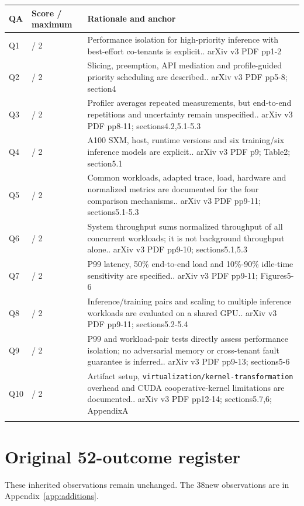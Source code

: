 \begin{longtable}{>{\raggedright\arraybackslash}p{}>{\raggedright\arraybackslash}p{}>{\raggedright\arraybackslash}p{}}
\toprule
\textbf{QA} & \textbf{Score / maximum} & \textbf{Rationale and anchor}\\\midrule\endhead
Q1 & 2 / 2 & Performance isolation for high-priority inference with best-effort co-tenants is explicit.. arXiv v3 PDF pp1-2\\\addlinespace
Q2 & 2 / 2 & Slicing, preemption, API mediation and profile-guided priority scheduling are described.. arXiv v3 PDF pp5-8; section4\\\addlinespace
Q3 & 1 / 2 & Profiler averages repeated measurements, but end-to-end repetitions and uncertainty remain unspecified.. arXiv v3 PDF pp8-11; sections4.2,5.1-5.3\\\addlinespace
Q4 & 2 / 2 & A100 SXM, host, runtime versions and six training/six inference models are explicit.. arXiv v3 PDF p9; Table2; section5.1\\\addlinespace
Q5 & 2 / 2 & Common workloads, adapted trace, load, hardware and normalized metrics are documented for the four comparison mechanisms.. arXiv v3 PDF pp9-11; sections5.1-5.3\\\addlinespace
Q6 & 2 / 2 & System throughput sums normalized throughput of all concurrent workloads; it is not background throughput alone.. arXiv v3 PDF pp9-10; sections5.1,5.3\\\addlinespace
Q7 & 2 / 2 & P99 latency, 50\% end-to-end load and 10\%-90\% idle-time sensitivity are specified.. arXiv v3 PDF pp9-11; Figures5-6\\\addlinespace
Q8 & 2 / 2 & Inference/training pairs and scaling to multiple inference workloads are evaluated on a shared GPU.. arXiv v3 PDF pp9-11; sections5.2-5.4\\\addlinespace
Q9 & 2 / 2 & P99 and workload-pair tests directly assess performance isolation; no adversarial memory or cross-tenant fault guarantee is inferred.. arXiv v3 PDF pp9-13; sections5-6\\\addlinespace
Q10 & 2 / 2 & Artifact setup, \nolinkurl{virtualization/kernel-transformation} overhead and CUDA cooperative-kernel limitations are documented.. arXiv v3 PDF pp12-14; sections5.7,6; AppendixA\\\addlinespace
\bottomrule\end{longtable}

\clearpage\section{Original 52-outcome register}\label{app:evidence}
These inherited observations remain unchanged. The 38new observations are in Appendix~\ref{app:additions}.

